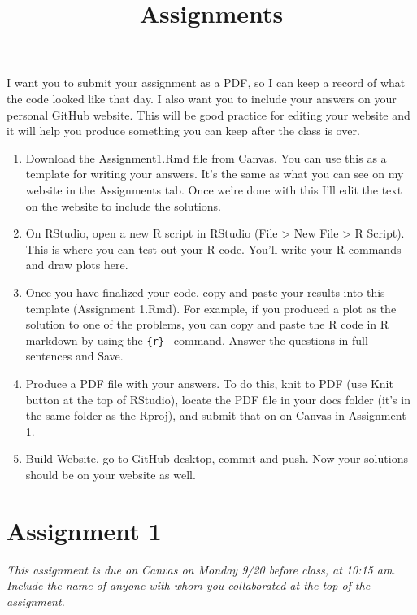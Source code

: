 \documentclass[
]{article}
\title{Assignments}
\author{}
\date{\vspace{-2.5em}}
\begin{document}
\maketitle

I want you to submit your assignment as a PDF, so I can keep a record of
what the code looked like that day. I also want you to include your
answers on your personal GitHub website. This will be good practice for
editing your website and it will help you produce something you can keep
after the class is over.

\begin{enumerate}
\def\labelenumi{\arabic{enumi}.}
\item
  Download the Assignment1.Rmd file from Canvas. You can use this as a
  template for writing your answers. It's the same as what you can see
  on my website in the Assignments tab. Once we're done with this I'll
  edit the text on the website to include the solutions.
\item
  On RStudio, open a new R script in RStudio (File \textgreater{} New
  File \textgreater{} R Script). This is where you can test out your R
  code. You'll write your R commands and draw plots here.
\item
  Once you have finalized your code, copy and paste your results into
  this template (Assignment 1.Rmd). For example, if you produced a plot
  as the solution to one of the problems, you can copy and paste the R
  code in R markdown by using the
  \texttt{\textasciigrave{}\textasciigrave{}\{r\}\ \textasciigrave{}\textasciigrave{}\textasciigrave{}}
  command. Answer the questions in full sentences and Save.
\item
  Produce a PDF file with your answers. To do this, knit to PDF (use
  Knit button at the top of RStudio), locate the PDF file in your docs
  folder (it's in the same folder as the Rproj), and submit that on on
  Canvas in Assignment 1.
\item
  Build Website, go to GitHub desktop, commit and push. Now your
  solutions should be on your website as well.
\end{enumerate}

\hypertarget{assignment-1}{%
\section{Assignment 1}\label{assignment-1}}

\emph{This assignment is due on Canvas on Monday 9/20 before class, at
10:15 am. Include the name of anyone with whom you collaborated at the
top of the assignment.}
\end{document}
